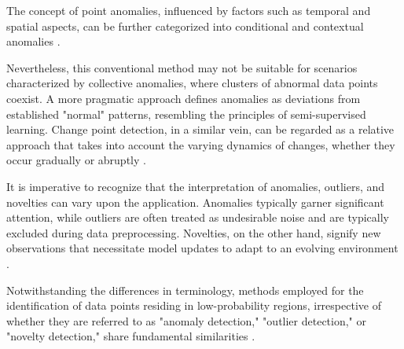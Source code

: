 The concept of point anomalies, influenced by factors such as temporal and spatial aspects, can be further categorized into conditional and contextual anomalies \citep{Ruff2021}.

Nevertheless, this conventional method may not be suitable for scenarios characterized by collective anomalies, where clusters of abnormal data points coexist. A more pragmatic approach defines anomalies as deviations from established "normal" patterns, resembling the principles of semi-supervised learning. Change point detection, in a similar vein, can be regarded as a relative approach that takes into account the varying dynamics of changes, whether they occur gradually or abruptly \citep{IGLESIASVAZQUEZ2023120994}.

It is imperative to recognize that the interpretation of anomalies, outliers, and novelties can vary upon the application. Anomalies typically garner significant attention, while outliers are often treated as undesirable noise and are typically excluded during data preprocessing. Novelties, on the other hand, signify new observations that necessitate model updates to adapt to an evolving environment \citep{Ruff2021}.

Notwithstanding the differences in terminology, methods employed for the identification of data points residing in low-probability regions, irrespective of whether they are referred to as "anomaly detection," "outlier detection," or "novelty detection," share fundamental similarities \citep{IGLESIASVAZQUEZ2023120994}.


\begin{figure}[htbp]
  \centering
  \caption{}
  \label{fig:anomaly}
\end{figure}
